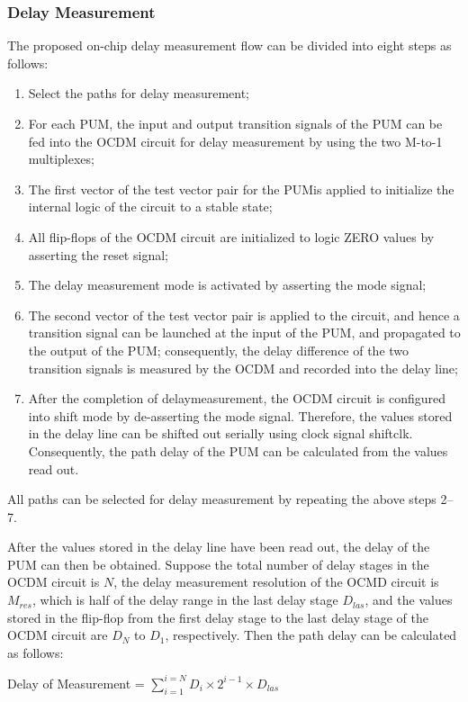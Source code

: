 \subsubsection{Delay Measurement}
The proposed on-chip delay measurement flow can be divided into eight steps as follows:
\begin{enumerate}[{1)}]
    \item Select the paths for delay measurement;
    \item For each PUM, the input and output transition signals of the PUM can be fed into the OCDM circuit for delay measurement by using the two M-to-1 multiplexes;
    \item The first vector of the test vector pair for the PUMis applied to initialize the internal logic of the circuit to a stable state; 
    \item All flip-flops of the OCDM circuit are initialized to logic ZERO values by asserting the reset signal; 
    \item The delay measurement mode is activated by asserting the mode signal; 
    \item The second vector of the test vector pair is applied to the circuit, and hence a transition signal can be launched at the input of the PUM, and propagated to the output of the PUM; consequently, the delay difference of the two transition signals is measured by the OCDM and recorded into the delay line; 
    \item After the completion of delaymeasurement, the OCDM circuit is configured into shift mode by de-asserting the mode signal. Therefore, the values stored in the delay line can be shifted out serially using clock signal shiftclk. Consequently, the path delay of the PUM can be calculated from the values read out.
\end{enumerate}

All paths can be selected for delay measurement by repeating the above steps 2–7.

After the values stored in the delay line have been read out, the delay of the PUM can then be obtained. Suppose the total number of delay stages in the OCDM circuit is $N$, the delay measurement resolution of the OCMD circuit is $M_{res}$, which is half of the delay range in the last delay stage $D_{las}$, and the values stored in the flip-flop from the first delay stage to the last delay stage of the OCDM circuit are $D_{N}$ to $D_{1}$, respectively. Then the path delay can be calculated as follows:


Delay of Measurement = $\sum_{i=1}^{i=N}D_{i} \times 2^{i-1}\times D_{las}$

